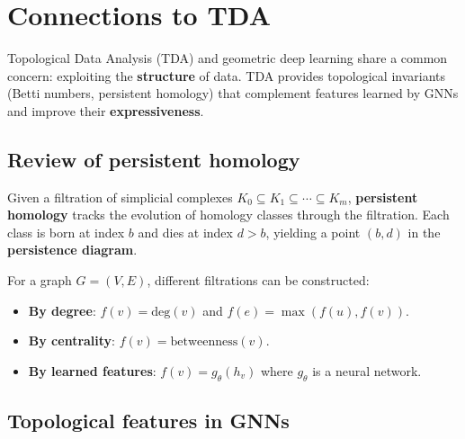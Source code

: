 \chapter{Connections to TDA}
\label{ch:tda}

\begin{intuition}
Topological Data Analysis (TDA) and geometric deep
learning share a common concern: exploiting the \textbf{structure}
of data. TDA provides topological invariants (Betti numbers,
persistent homology) that complement features learned by GNNs
and improve their \textbf{expressiveness}.
\end{intuition}

\section{Review of persistent homology}
\label{sec:persistent_homology_review}

\begin{definition}
Given a filtration of simplicial complexes
$K_0 \subseteq K_1 \subseteq \cdots \subseteq K_m$,
\textbf{persistent homology} tracks the evolution of homology
classes through the filtration. Each class is born at index $b$
and dies at index $d > b$, yielding a point $(b, d)$ in the
\textbf{persistence diagram}.
\end{definition}

\begin{remark}
For a graph $G = (V, E)$, different filtrations can be constructed:
\begin{itemize}
  \item \textbf{By degree}: $f(v) = \mathrm{deg}(v)$ and
        $f(e) = \max(f(u), f(v))$.
  \item \textbf{By centrality}: $f(v) = \mathrm{betweenness}(v)$.
  \item \textbf{By learned features}: $f(v) = g_\theta(h_v)$
        where $g_\theta$ is a neural network.
\end{itemize}
\end{remark}

\section{Topological features in GNNs}
\label{sec:topo_features}

